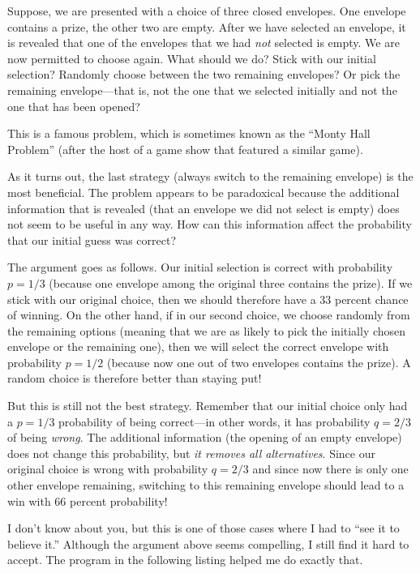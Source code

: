 Suppose, we are presented with a choice of three closed envelopes. One
envelope contains a prize, the other two are empty. After we have
selected an envelope, it is revealed that one of the envelopes that we
had \emph{not} selected is empty. We are now permitted to choose
again.  What should we do? Stick with our initial selection? Randomly
choose between the two remaining envelopes? Or pick the remaining
envelope---that is, not the one that we selected initially and not the
one that has been opened?

This is a famous problem, which is sometimes known as the ``Monty Hall
Problem'' (after the host of a game show that featured a similar game).

As it turns out, the last strategy (always switch to the remaining
envelope) is the most beneficial. The problem appears to be
paradoxical because the additional information that is revealed (that
an envelope we did not select is empty) does not seem to be useful in
any way. How can this information affect the probability that our
initial guess was correct?

The argument goes as follows. Our initial selection is correct with
probability $p = 1/3$ (because one envelope among the original three
contains the prize). If we stick with our original choice, then we
should therefore have a 33 percent chance of winning.  On the other
hand, if in our second choice, we choose randomly from the remaining
options (meaning that we are as likely to pick the initially chosen
envelope or the remaining one), then we will select the correct
envelope with probability $p = 1/2$ (because now one out of two
envelopes contains the prize). A random choice is therefore better
than staying put!

But this is still not the best strategy. Remember that our initial
choice only had a $p = 1/3$ probability of being correct---in other
words, it has probability $q = 2/3$ of being \emph{wrong}. The
additional information (the opening of an empty envelope) does not
change this probability, but \emph{it removes all alternatives}. Since
our original choice is wrong with probability $q = 2/3$ and since now
there is only one other envelope remaining, switching to this
remaining envelope should lead to a win with 66 percent probability!

I don't know about you, but this is one of those cases where I had to
``see it to believe it.'' Although the argument above seems
compelling, I still find it hard to accept. The program in the
following listing helped me do exactly that.


